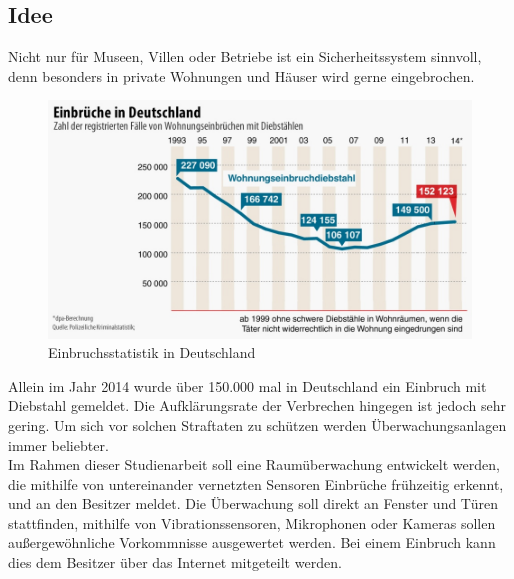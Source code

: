 \subsection{Idee}\label{ss:Idee}

Nicht nur für Museen, Villen oder Betriebe ist ein Sicherheitssystem sinnvoll, denn besonders in private Wohnungen und Häuser wird gerne eingebrochen.

\begin{figure}[H] 
	\centering
	\includegraphics[scale=0.35]{Bilder/einbrueche}
	\caption{Einbruchsstatistik in Deutschland\cite{i:einbrueche}}
	\label{f:einrbrueche}
\end{figure}

Allein im Jahr 2014 wurde über 150.000 mal in Deutschland ein Einbruch mit Diebstahl gemeldet. Die Aufklärungsrate der Verbrechen hingegen ist jedoch sehr gering. Um sich vor solchen Straftaten zu schützen werden Überwachungsanlagen immer beliebter.\\
Im Rahmen dieser Studienarbeit soll eine Raumüberwachung entwickelt werden, die mithilfe von untereinander vernetzten Sensoren Einbrüche frühzeitig erkennt, und an den Besitzer meldet. Die Überwachung soll direkt an Fenster und Türen stattfinden, mithilfe von Vibrationssensoren, Mikrophonen oder Kameras sollen außergewöhnliche Vorkommnisse ausgewertet werden. Bei einem Einbruch kann dies dem Besitzer über das Internet mitgeteilt werden.

